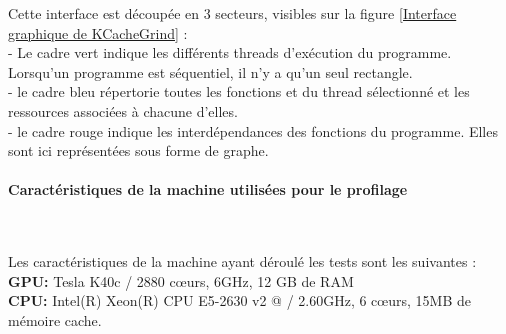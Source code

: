 \documentclass[10pt]{report}
\begin{document}
Cette interface est découpée en 3 secteurs, visibles sur la figure \ref{Interface graphique de KCacheGrind} : \\
- Le cadre vert indique les différents threads d'exécution du programme. Lorsqu'un programme est séquentiel, il n'y a qu'un seul rectangle.\\
- le cadre bleu répertorie toutes les fonctions et du thread sélectionné et les ressources associées à chacune d'elles.\\
- le cadre rouge indique les interdépendances des fonctions du programme. Elles sont ici représentées sous forme de graphe.\\ 

\paragraph{Caractéristiques de la machine utilisées pour le profilage}  ~\par 
Les caractéristiques de la machine ayant déroulé les tests sont les suivantes :\\
 \textbf{GPU:} Tesla K40c / 2880 cœurs, 6GHz, 12 GB de RAM\\
 \textbf{CPU:} Intel(R) Xeon(R) CPU E5-2630 v2 @ / 2.60GHz, 6 cœurs, 15MB de mémoire cache.
\newpage
\end{document}
